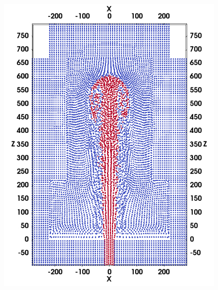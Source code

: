 \documentclass[review]{elsarticle}
\begin{document}
\begin{figure}[!ht]
\begin{minipage}[t]{.325\textwidth}
    \end{minipage}%
    \\
    \centering
    \begin{minipage}[t]{.325 \textwidth}
        \centering
        \includegraphics[width=0.99 \textwidth]{./Figures/GSPH-HLLC-t3-cutView}
    \end{minipage}%
    \begin{minipage}[t]{.325\textwidth}
        \centering

\end{minipage}
\end{figure}
\end{document}
